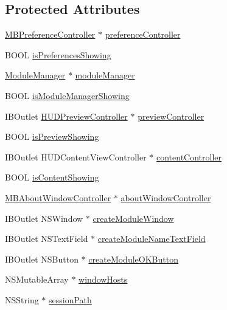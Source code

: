 \subsection*{Protected Attributes}
\begin{DoxyCompactItemize}
\item 
\hyperlink{interface_m_b_preference_controller}{M\-B\-Preference\-Controller} $\ast$ \hyperlink{interface_app_controller_a5bc4f1ca156721d705b78556b7be79e0}{preference\-Controller}
\item 
B\-O\-O\-L \hyperlink{interface_app_controller_a45274a50821c76ff5f24e1c1aa5553d0}{is\-Preferences\-Showing}
\item 
\hyperlink{interface_module_manager}{Module\-Manager} $\ast$ \hyperlink{interface_app_controller_aa4c387b05931fd96bd4b98577cf4da1a}{module\-Manager}
\item 
B\-O\-O\-L \hyperlink{interface_app_controller_a41fe0a359f090352756784fb19e2d4e3}{is\-Module\-Manager\-Showing}
\item 
I\-B\-Outlet \hyperlink{interface_h_u_d_preview_controller}{H\-U\-D\-Preview\-Controller} $\ast$ \hyperlink{interface_app_controller_ad76eba40dc893c5abde5dca7c58ed85c}{preview\-Controller}
\item 
B\-O\-O\-L \hyperlink{interface_app_controller_a6c22ed5e2dd56ef128c54de665a1bba5}{is\-Preview\-Showing}
\item 
I\-B\-Outlet H\-U\-D\-Content\-View\-Controller $\ast$ \hyperlink{interface_app_controller_add8b8156fae5882baadbc970259be514}{content\-Controller}
\item 
B\-O\-O\-L \hyperlink{interface_app_controller_ad2ea5ca2afc734929f4942020d043a4b}{is\-Content\-Showing}
\item 
\hyperlink{interface_m_b_about_window_controller}{M\-B\-About\-Window\-Controller} $\ast$ \hyperlink{interface_app_controller_a996d28463c3bd7cb51fbc3ec2715d474}{about\-Window\-Controller}
\item 
I\-B\-Outlet N\-S\-Window $\ast$ \hyperlink{interface_app_controller_aeff9b552867367894c25ef7fc41661bc}{create\-Module\-Window}
\item 
I\-B\-Outlet N\-S\-Text\-Field $\ast$ \hyperlink{interface_app_controller_a4560b8a317e31fc0089a7b22012c7cda}{create\-Module\-Name\-Text\-Field}
\item 
I\-B\-Outlet N\-S\-Button $\ast$ \hyperlink{interface_app_controller_a39de0726ae67c4b54adfe94c003e6096}{create\-Module\-O\-K\-Button}
\item 
N\-S\-Mutable\-Array $\ast$ \hyperlink{interface_app_controller_a7c0f9ff6d61aace19ae403c73acbc518}{window\-Hosts}
\item 
N\-S\-String $\ast$ \hyperlink{interface_app_controller_a2bc77f00fb3042642694252f4cb00da5}{session\-Path}
\end{DoxyCompactItemize}


